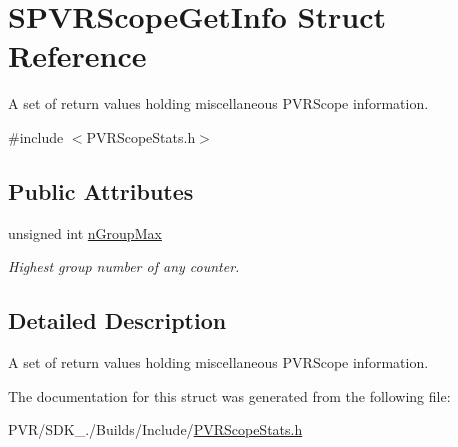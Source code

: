 \hypertarget{struct_s_p_v_r_scope_get_info}{\section{S\+P\+V\+R\+Scope\+Get\+Info Struct Reference}
\label{struct_s_p_v_r_scope_get_info}
}


A set of return values holding miscellaneous P\+V\+R\+Scope information.  




{\ttfamily \#include $<$P\+V\+R\+Scope\+Stats.\+h$>$}

\subsection*{Public Attributes}
\begin{DoxyCompactItemize}
\item 
\hypertarget{struct_s_p_v_r_scope_get_info_a6be637f229427b8814357ece6cac25f8}{unsigned int \hyperlink{struct_s_p_v_r_scope_get_info_a6be637f229427b8814357ece6cac25f8}{n\+Group\+Max}}\label{struct_s_p_v_r_scope_get_info_a6be637f229427b8814357ece6cac25f8}

\begin{DoxyCompactList}\small\item\em Highest group number of any counter. \end{DoxyCompactList}\end{DoxyCompactItemize}


\subsection{Detailed Description}
A set of return values holding miscellaneous P\+V\+R\+Scope information. 



 

The documentation for this struct was generated from the following file\+:\begin{DoxyCompactItemize}
\item 
P\+V\+R/\+S\+D\+K\+\_./\+Builds/\+Include/\hyperlink{_p_v_r_scope_stats_8h}{P\+V\+R\+Scope\+Stats.\+h}\end{DoxyCompactItemize}
